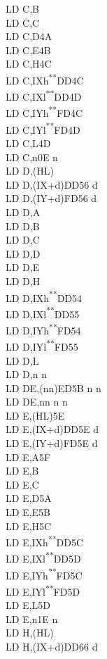 \documentclass[12pt,twoside,openright,a4paper]{book}
\newcommand{\UNDOC}{\textnormal{\textsuperscript{**}}}
\begin{document}
\begin{multicols}{3}
{\begin{tabbing}
	LD C,B\\
	LD C,C\\
	LD C,D\>4A\\
	LD C,E\>4B\\
	LD C,H\>4C\\
	LD C,IXh\UNDOC\>DD4C\\
	LD C,IXl\UNDOC\>DD4D\\
	LD C,IYh\UNDOC\>FD4C\\
	LD C,IYl\UNDOC\>FD4D\\
	LD C,L\>4D\\
	LD C,n\>0E n\\
	LD D,(HL)\\
	LD D,(IX+d)\>DD56 d\\
	LD D,(IY+d)\>FD56 d\\
	LD D,A\\
	LD D,B\\
	LD D,C\\
	LD D,D\\
	LD D,E\\
	LD D,H\\
	LD D,IXh\UNDOC\>DD54\\
	LD D,IXl\UNDOC\>DD55\\
	LD D,IYh\UNDOC\>FD54\\
	LD D,IYl\UNDOC\>FD55\\
	LD D,L\\
	LD D,n n\\
	LD DE,(nn)\>ED5B n n\\
	LD DE,nn n n\\
	LD E,(HL)\>5E\\
	LD E,(IX+d)\>DD5E d\\
	LD E,(IY+d)\>FD5E d\\
	LD E,A\>5F\\
	LD E,B\\
	LD E,C\\
	LD E,D\>5A\\
	LD E,E\>5B\\
	LD E,H\>5C\\
	LD E,IXh\UNDOC\>DD5C\\
	LD E,IXl\UNDOC\>DD5D\\
	LD E,IYh\UNDOC\>FD5C\\
	LD E,IYl\UNDOC\>FD5D\\
	LD E,L\>5D\\
	LD E,n\>1E n\\
	LD H,(HL)\\
	LD H,(IX+d)\>DD66 d\\

\end{tabbing}}
\end{multicols}
\end{document}
